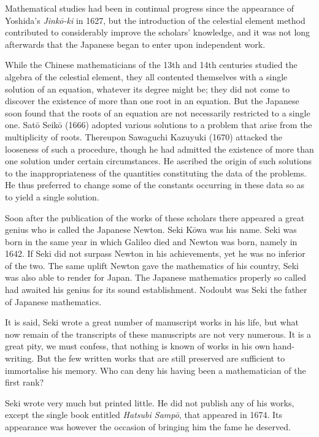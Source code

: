 \documentclass[11pt]{article}
\newcommand{\scanpage}[2]{\clearpage\setcounter{footnote}{0}\noindent{\footnotesize\color{gray}PDF page #1 · #2}\par\medskip}
\newcommand{\scanfooter}{}
\begin{document}
Mathematical studies had been in continual progress since the appearance of Yoshida's \emph{Jinkō-ki} in 1627, but the introduction of the celestial element method contributed to considerably improve the scholars' knowledge, and it was not long afterwards that the Japanese began to enter upon independent work.

While the Chinese mathematicians of the 13th and 14th centuries studied the algebra of the celestial element, they all contented themselves with a single solution of an equation, whatever its degree might be; they did not come to discover the existence of more than one root in an equation. But the Japanese soon found that the roots of an equation are not necessarily restricted to a single one. Satō Seikō (1666) adopted various solutions to a problem that arise from the multiplicity of roots. Thereupon Sawaguchi Kazuyuki (1670) attacked the looseness of such a procedure, though he had admitted the existence of more than one solution under certain circumstances. He ascribed the origin of such solutions to the inappropriateness of the quantities constituting the data of the problems. He thus preferred to change some of the constants occurring in these data so as to yield a single solution.

Soon after the publication of the works of these scholars there appeared a great genius who is called the Japanese Newton. Seki Kōwa was his name. Seki was born in the same year in which Galileo died and Newton was born, namely in 1642. If Seki did not surpass Newton in his achievements, yet he was no inferior of the two. The same uplift Newton gave the mathematics of his country, Seki was also able to render for Japan. The Japanese mathematics properly so called had awaited his genius for its sound establishment. Nodoubt was Seki the father of Japanese mathematics.
\scanfooter

\scanpage{0173}{Chapter 22, printed page 159}
It is said, Seki wrote a great number of manuscript works in his life, but what now remain of the transcripts of these manuscripts are not very numerous. It is a great pity, we must confess, that nothing is known of works in his own hand-writing. But the few written works that are still preserved are sufficient to immortalise his memory. Who can deny his having been a mathematician of the first rank?

Seki wrote very much but printed little. He did not publish any of his works, except the single book entitled \emph{Hatsubi Sampō}, that appeared in 1674. Its appearance was however the occasion of bringing him the fame he deserved.
\end{document}
